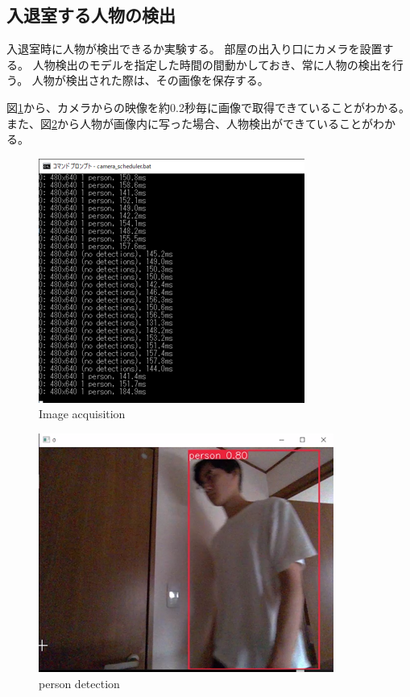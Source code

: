 \documentclass[10pt]{jarticle}
\begin{document}
    \subsection{入退室する人物の検出}
    \label{experiment1}

入退室時に人物が検出できるか実験する。
部屋の出入り口にカメラを設置する。
人物検出のモデルを指定した時間の間動かしておき、常に人物の検出を行う。
人物が検出された際は、その画像を保存する。

図\ref{Image acquisition}から、カメラからの映像を約0.2秒毎に画像で取得できていることがわかる。
また、図\ref{person detection}から人物が画像内に写った場合、人物検出ができていることがわかる。

\begin{figure}[!h]
    \centering
    \includegraphics[width=0.8\linewidth]{fig/frame.png}
    \caption{Image acquisition}
    \label{Image acquisition}
    \end{figure}

\begin{figure}[!h]
    \centering
    \includegraphics[width=0.8\linewidth]{fig/boundingbox.png}
    \caption{person detection}
    \label{person detection}
    \end{figure}
\end{document}
